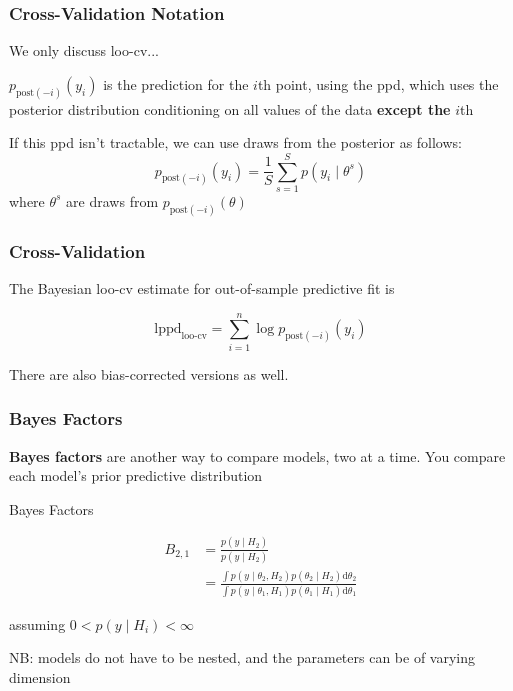 \documentclass{beamer}
\begin{document}
\begin{frame}
\frametitle{Cross-Validation Notation}

We only discuss loo-cv...
\newline

$p_{\text{post}(-i)}(y_i)$ is the prediction for the $i$th point, using the ppd, which uses the posterior distribution conditioning on all values of the data {\bf except the} $i$th
\newline

If this ppd isn't tractable, we can use draws from the posterior as follows:
\[
p_{\text{post}(-i)}(y_i) = \frac{1}{S}\sum_{s=1}^S p(y_i \mid \theta^s)
\]
where $\theta^s$ are draws from $p_{\text{post}(-i)}(\theta)$
\newline

\end{frame}

\begin{frame}
\frametitle{Cross-Validation}


The Bayesian loo-cv estimate for out-of-sample predictive fit is 

\[
\text{lppd}_{\text{loo-cv}} = \sum_{i=1}^n \log p_{\text{post}(-i)}(y_i)
\]

There are also bias-corrected versions as well.

\end{frame}

\begin{frame}
\frametitle{Bayes Factors}

{\bf Bayes factors} are another way to compare models, two at a time. You compare each model's prior predictive distribution
\begin{block}{Bayes Factors}

\begin{align*}
B_{2,1} &= \frac{p(y \mid H_2)}{p(y \mid H_2)}\\
&= \frac{\int p(y \mid \theta_2, H_2)p(\theta_2 \mid H_2) \text{d}\theta_2}{\int p(y \mid \theta_1, H_1)p(\theta_1 \mid H_1) \text{d}\theta_1}
\end{align*}

assuming $0 < p(y \mid H_i) < \infty$
\end{block}

NB: models do not have to be nested, and the parameters can be of varying dimension

\end{frame}
\end{document}
